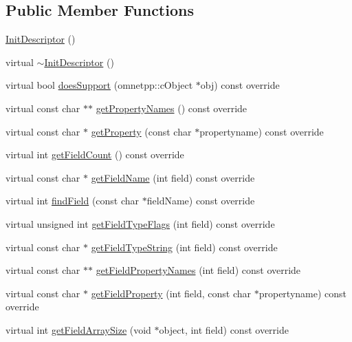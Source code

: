 \subsection*{Public Member Functions}
\begin{DoxyCompactItemize}
\item 
\hyperlink{classInitDescriptor_ab339ad8c646e3ebd54fca1d423669bcc}{Init\+Descriptor} ()
\item 
virtual \hyperlink{classInitDescriptor_a557046f2e1493c983f0dc57d67c48291}{$\sim$\+Init\+Descriptor} ()
\item 
virtual bool \hyperlink{classInitDescriptor_aa4691376d7b2f08fa800fff585125ea3}{does\+Support} (omnetpp\+::c\+Object $\ast$obj) const override
\item 
virtual const char $\ast$$\ast$ \hyperlink{classInitDescriptor_a50255fad26833319e82ea83650fa6eb9}{get\+Property\+Names} () const override
\item 
virtual const char $\ast$ \hyperlink{classInitDescriptor_a272a35c10d988eb431d03dd2d327512c}{get\+Property} (const char $\ast$propertyname) const override
\item 
virtual int \hyperlink{classInitDescriptor_ac70ed57d62820b4dd4bd68b55d4c8b10}{get\+Field\+Count} () const override
\item 
virtual const char $\ast$ \hyperlink{classInitDescriptor_a0c6fa440b30d1abd3d6e76f9845c6699}{get\+Field\+Name} (int field) const override
\item 
virtual int \hyperlink{classInitDescriptor_aa2e3648dd471c37754733337cbdccea0}{find\+Field} (const char $\ast$field\+Name) const override
\item 
virtual unsigned int \hyperlink{classInitDescriptor_ac608a1e528e9e41968ac118ff3c138e5}{get\+Field\+Type\+Flags} (int field) const override
\item 
virtual const char $\ast$ \hyperlink{classInitDescriptor_a5896b2cc03302e1b6f67168f0e9612e6}{get\+Field\+Type\+String} (int field) const override
\item 
virtual const char $\ast$$\ast$ \hyperlink{classInitDescriptor_a540feb97164ff9118592619a94887e35}{get\+Field\+Property\+Names} (int field) const override
\item 
virtual const char $\ast$ \hyperlink{classInitDescriptor_a9ec2bc98d856cb3166f66eab70eb6279}{get\+Field\+Property} (int field, const char $\ast$propertyname) const override
\item 
virtual int \hyperlink{classInitDescriptor_a7d04a2b854a3408ae32479cfb5eeb253}{get\+Field\+Array\+Size} (void $\ast$object, int field) const override

\end{DoxyCompactItemize}
